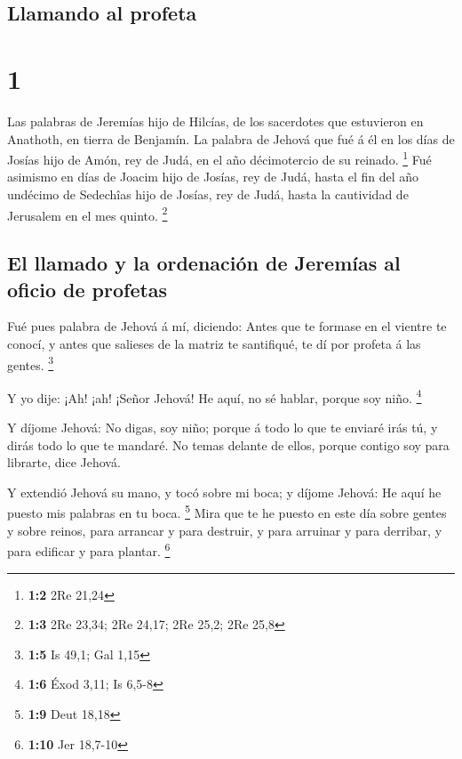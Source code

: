 \hypertarget{llamando-al-profeta}{%
\subsection{Llamando al profeta}\label{llamando-al-profeta}}

\hypertarget{section}{%
\section{1}\label{section}}

 Las palabras de Jeremías hijo de Hilcías, de los sacerdotes
que estuvieron en Anathoth, en tierra de Benjamín.  La
palabra de Jehová que fué á él en los días de Josías hijo de Amón, rey
de Judá, en el año décimotercio de su reinado. \footnote{\textbf{1:2}
  2Re 21,24}  Fué asimismo en días de Joacim hijo de Josías,
rey de Judá, hasta el fin del año undécimo de Sedechîas hijo de Josías,
rey de Judá, hasta la cautividad de Jerusalem en el mes quinto.
\footnote{\textbf{1:3} 2Re 23,34; 2Re 24,17; 2Re 25,2; 2Re 25,8}

\hypertarget{el-llamado-y-la-ordenaciuxf3n-de-jeremuxedas-al-oficio-de-profetas}{%
\subsection{El llamado y la ordenación de Jeremías al oficio de
profetas}\label{el-llamado-y-la-ordenaciuxf3n-de-jeremuxedas-al-oficio-de-profetas}}

 Fué pues palabra de Jehová á mí, diciendo: 
Antes que te formase en el vientre te conocí, y antes que salieses de la
matriz te santifiqué, te dí por profeta á las gentes. \footnote{\textbf{1:5}
  Is 49,1; Gal 1,15}

 Y yo dije: ¡Ah! ¡ah! ¡Señor Jehová! He aquí, no sé hablar,
porque soy niño. \footnote{\textbf{1:6} Éxod 3,11; Is 6,5-8}

 Y díjome Jehová: No digas, soy niño; porque á todo lo que
te enviaré irás tú, y dirás todo lo que te mandaré.  No
temas delante de ellos, porque contigo soy para librarte, dice Jehová.

 Y extendió Jehová su mano, y tocó sobre mi boca; y díjome
Jehová: He aquí he puesto mis palabras en tu boca. \footnote{\textbf{1:9}
  Deut 18,18}  Mira que te he puesto en este día sobre
gentes y sobre reinos, para arrancar y para destruir, y para arruinar y
para derribar, y para edificar y para plantar. \footnote{\textbf{1:10}
  Jer 18,7-10}

